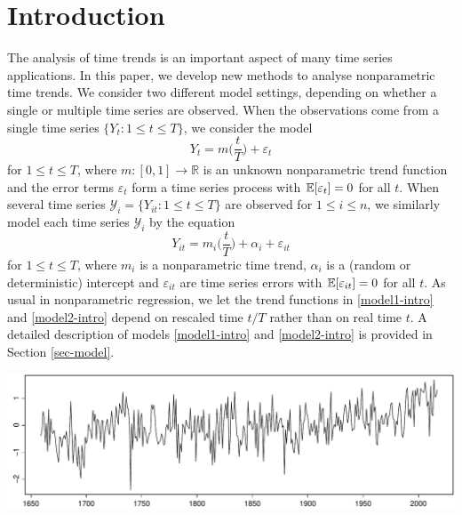
\section{Introduction}\label{sec-intro}


The analysis of time trends is an important aspect of many time series applications. In this paper, we develop new methods to analyse nonparametric time trends. 
We consider two different model settings, depending on whether a single or multiple time series are observed. When the observations come from a single time series $\{ Y_t: 1 \le t \le T \}$, we consider the model
\begin{equation}\label{model1-intro}
Y_t = m \Big( \frac{t}{T} \Big) + \varepsilon_t
\end{equation}
for $1 \le t \le T$, where $m: [0,1] \rightarrow \mathbb{R}$ is an unknown nonparametric trend function and the error terms $\varepsilon_t$ form a time series process with $\mathbb{E}[\varepsilon_t] = 0$ for all $t$. When several time series $\mathcal{Y}_i = \{ Y_{it}: 1 \le t \le T \}$ are observed for $1 \le i \le n$, we similarly model each time series $\mathcal{Y}_i$ by the equation
\begin{equation}\label{model2-intro}
Y_{it} = m_i \Big( \frac{t}{T} \Big) + \alpha_i + \varepsilon_{it}
\end{equation}
for $1 \le t \le T$, where $m_i$ is a nonparametric time trend, $\alpha_i$ is a (random or deterministic) intercept and $\varepsilon_{it}$ are time series errors with $\mathbb{E}[\varepsilon_{it}] = 0$ for all $t$. As usual in nonparametric regression, we let the trend functions in \eqref{model1-intro} and \eqref{model2-intro} depend on rescaled time $t/T$ rather than on real time $t$. A detailed description of models \eqref{model1-intro} and \eqref{model2-intro} is provided in Section \ref{sec-model}.

\begin{center}
\includegraphics[width=\textwidth, clip=true]{Coding/Output/temperature_data.pdf}
\label{yearly_data}%
\end{center}


